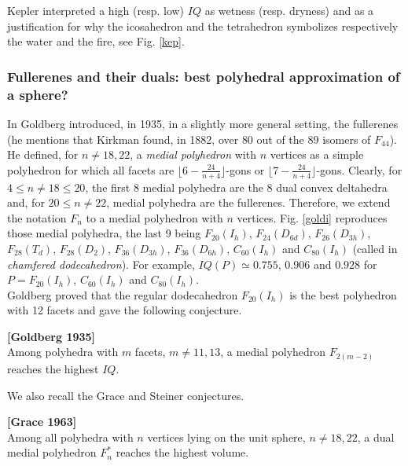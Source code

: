 \newpage
\noindent
{\sc Kepler} \cite{kepler} interpreted a high (resp. low) $IQ$ as wetness (resp. dryness) and 
as a justification for why the icosahedron and the tetrahedron symbolizes respectively
the water and the fire, see Fig. \ref{kep}.

\subsubsection{Fullerenes and their duals: best polyhedral approximation of a sphere?}
In \cite{g35} {\sc Goldberg} introduced, in 1935, in a slightly more general setting, the 
fullerenes (he mentions that {\sc Kirkman} \cite{kirk} found, in 1882, over $80$ 
out of the $89$ isomers of $F_{44}$). He defined, for $n\neq 18, 22$, a 
{\it medial polyhedron} with $n$ vertices as a simple polyhedron for which all 
facets are $\lfloor 6-\frac{24}{n+4}\rfloor$-gons or 
$\lfloor7-\frac{24}{n+4}\rfloor$-gons. Clearly, for 
$4\leq n\neq 18\leq 20$, the first $8$ medial polyhedra are the 8 dual convex deltahedra
and, for $20\leq n\neq 22$, medial polyhedra are the fullerenes. Therefore,
we extend the notation $F_n$ to a medial polyhedron with $n$ vertices.
Fig. \ref{goldi} reproduces those medial polyhedra, the last 9 being
$F_{20}(I_h)$, $F_{24}(D_{6d})$, $F_{26}(D_{3h})$, $F_{28}(T_d)$, $F_{28}(D_2)$,
$F_{36}(D_{3h})$, $F_{36}(D_{6h})$, $C_{60}(I_h)$ and $C_{80}(I_h)$ (called in \cite{g35}
{\it chamfered dodecahedron}). For example, $IQ(P)\simeq 0.755$, $0.906$ and $0.928$ for
$P=F_{20}(I_h)$, $C_{60}(I_h)$ and $C_{80}(I_h)$.\\

\noindent
 {\sc Goldberg} \cite{g35}
proved that the regular dodecahedron $F_{20}(I_h)$ is the best polyhedron with 12 facets and
gave the following conjecture.
\begin{conjecture}\label{cgo} {\bf [Goldberg 1935]}\\
Among polyhedra with $m$ facets, $m\neq 11,13$, a medial polyhedron 
$F_{2(m-2)}$ reaches the highest $IQ$.
\end{conjecture}
We also recall the {\sc Grace} \cite{grace} and {\sc Steiner} \cite{stein} conjectures.

\begin{conjecture}\label{cgr} {\bf [Grace 1963]}\\
Among all polyhedra with $n$ vertices lying on the unit sphere, $n\neq 18, 22$, a dual medial 
polyhedron $F^*_{n}$ reaches the highest volume.
\end{conjecture}

